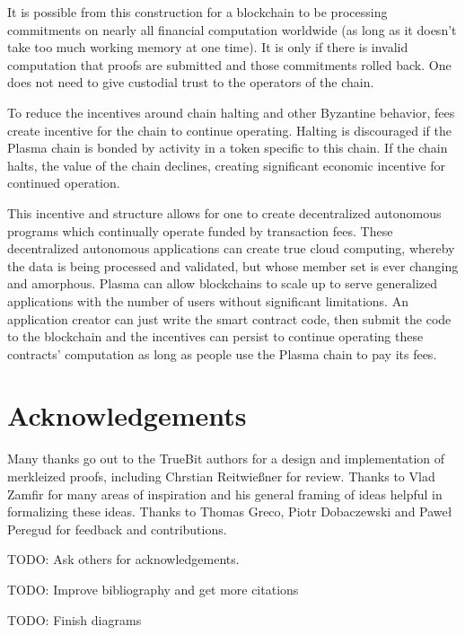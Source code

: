 \documentclass[letterpaper, 11pt]{article}
\begin{document}
It is possible from this construction for a blockchain to be processing
commitments on nearly all financial computation worldwide (as long as it doesn't
take too much working memory at one time). It is only if there is invalid
computation that proofs are submitted and those commitments rolled back. One
does not need to give custodial trust to the operators of the chain.

To reduce the incentives around chain halting and other Byzantine behavior, fees
create incentive for the chain to continue operating. Halting is discouraged if
the Plasma chain is bonded by activity in a token specific to this chain. If the
chain halts, the value of the chain declines, creating significant economic
incentive for continued operation.

This incentive and structure allows for one to create decentralized autonomous
programs which continually operate funded by transaction fees. These
decentralized autonomous applications can create true cloud computing, whereby
the data is being processed and validated, but whose member set is ever
changing and amorphous. Plasma can allow blockchains to scale up to serve
generalized applications with the number of users without significant
limitations. An application creator can just write the smart contract code,
then submit the code to the blockchain and the incentives can persist to
continue operating these contracts' computation as long as people use the
Plasma chain to pay its fees. 

\section{Acknowledgements}

Many thanks go out to the TrueBit authors for a design and implementation of
merkleized proofs, including Chrstian Reitwie{\ss}ner for review. Thanks to
Vlad Zamfir for many areas of inspiration and his general framing of ideas
helpful in formalizing these ideas. Thanks to Thomas Greco, Piotr Dobaczewski
and Pawe\l{} Peregud
for feedback and contributions.

TODO: Ask others for acknowledgements.

TODO: Improve bibliography and get more citations

TODO: Finish diagrams

\end{document}
